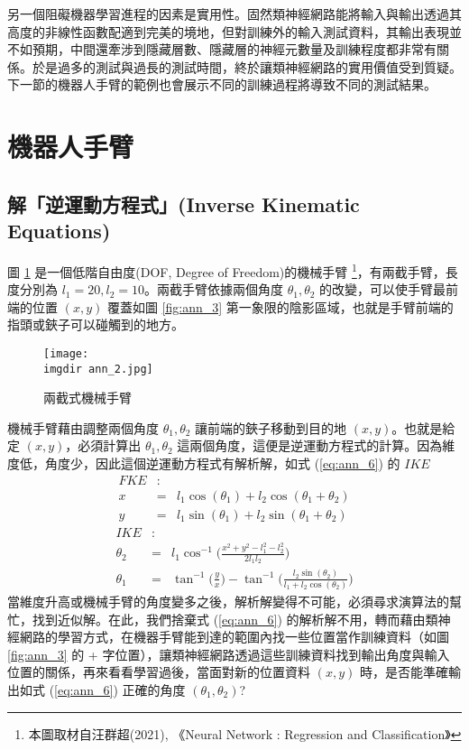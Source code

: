 另一個阻礙機器學習進程的因素是實用性。固然類神經網路能將輸入與輸出透過其高度的非線性函數配適到完美的境地，但對訓練外的輸入測試資料，其輸出表現並不如預期，中間還牽涉到隱藏層數、隱藏層的神經元數量及訓練程度都非常有關係。於是過多的測試與過長的測試時間，終於讓類神經網路的實用價值受到質疑。下一節的機器人手臂的範例也會展示不同的訓練過程將導致不同的測試結果。

\section{機器人手臂}
\subsection{解「逆運動方程式」(Inverse Kinematic Equations)}

圖 \ref{fig:ann_2} 是一個低階自由度(DOF, Degree of Freedom)的機械手臂 \footnote{本圖取材自汪群超(2021), 《Neural Network : Regression and Classification》}，有兩截手臂，長度分別為 $l_1 = 20, l_2 = 10$。兩截手臂依據兩個角度 $\theta_1, \theta_2$ 的改變，可以使手臂最前端的位置 $(x, y)$ 覆蓋如圖 \ref{fig:ann_3} 第一象限的陰影區域，也就是手臂前端的指頭或鋏子可以碰觸到的地方。

\begin{figure}[H]
    \centering
        \texttt{[image: \\imgdir ann\_2.jpg]}
    \caption{兩截式機械手臂}
    \label{fig:ann_2}
\end{figure}

機械手臂藉由調整兩個角度 $\theta_1, \theta_2$ 讓前端的鋏子移動到目的地 $(x, y)$。也就是給定 $(x, y)$，必須計算出 $\theta_1, \theta_2$ 這兩個角度，這便是逆運動方程式的計算。因為維
度低，角度少，因此這個逆運動方程式有解析解，如式 (\ref{eq:ann_6}) 的 $IKE$
\begin{eqnarray}\label{eq:ann_5}
FKE & : & \nonumber \\
x   & = & l_1 \cos(\theta_1) + l_2 \cos(\theta_1 + \theta_2)\nonumber \\
y   & = & l_1 \sin(\theta_1) + l_2 \sin(\theta_1 + \theta_2)
\end{eqnarray}
\begin{eqnarray}\label{eq:ann_6}
IKE & : & \nonumber \\
\theta_2  & = & l_1 \cos^{-1}\bigg(\frac{x^2 + y^2 - l_1^2 - l_2^2}{2l_1 l_2}\bigg) \nonumber \\
\theta_1  & = & \tan^{-1}\bigg(\frac{y}{x}\bigg) - \tan^{-1}\bigg(\frac{l_2\sin(\theta_2)}{l_1 + l_2\cos(\theta_2)}\bigg)
\end{eqnarray}
當維度升高或機械手臂的角度變多之後，解析解變得不可能，必須尋求演算法的幫忙，找到近似解。在此，我們捨棄式 (\ref{eq:ann_6}) 的解析解不用，轉而藉由類神經網路的學習方式，在機器手臂能到達的範圍內找一些位置當作訓練資料（如圖 \ref{fig:ann_3} 的 + 字位置），讓類神經網路透過這些訓練資料找到輸出角度與輸入位置的關係，再來看看學習過後，當面對新的位置資料 $(x, y)$ 時，是否能準確輸出如式 (\ref{eq:ann_6}) 正確的角度 $(\theta_1, \theta_2)$?

